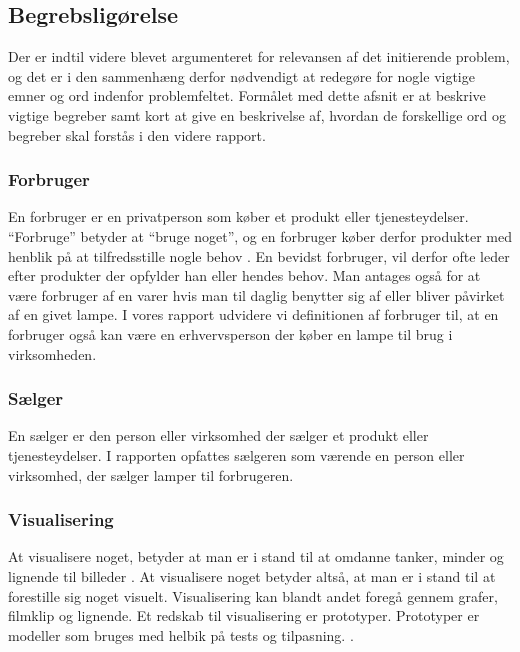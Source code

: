 \subsection{Begrebsligørelse}

Der er indtil videre blevet  argumenteret for relevansen af det initierende problem, og det er i den sammenhæng derfor nødvendigt at redegøre for nogle vigtige emner og ord indenfor problemfeltet. Formålet med dette afsnit er at beskrive vigtige begreber samt kort at give en beskrivelse af, hvordan de forskellige ord og begreber skal forstås i den videre rapport.


\subsubsection{Forbruger}
En forbruger er en privatperson som køber et produkt eller tjenesteydelser. “Forbruge” betyder at “bruge noget”, og en forbruger køber derfor produkter med henblik på at tilfredsstille nogle behov \cite{forbrugerportalen}. En bevidst forbruger, vil derfor ofte leder efter produkter der opfylder han eller hendes behov. Man antages også for at være forbruger af en varer hvis man til daglig benytter sig af eller bliver påvirket af en givet  lampe.
I vores rapport udvidere vi definitionen af forbruger til, at en forbruger også kan være en erhvervsperson der køber en lampe til brug i virksomheden.

\subsubsection{Sælger}
En sælger er den person eller virksomhed der sælger et produkt eller tjenesteydelser. I rapporten opfattes sælgeren som værende en person eller virksomhed, der sælger lamper til forbrugeren. 

\subsubsection{Visualisering}
At visualisere noget, betyder at man er i stand til at omdanne tanker, minder og lignende til billeder \cite{ddo_visualisering}. At visualisere noget betyder altså, at man er i stand til at forestille sig noget visuelt. Visualisering kan blandt andet foregå gennem grafer, filmklip og lignende.  
Et redskab til visualisering er prototyper. Prototyper er modeller som bruges med helbik på tests og tilpasning. \cite{prototyper_pdf}.

